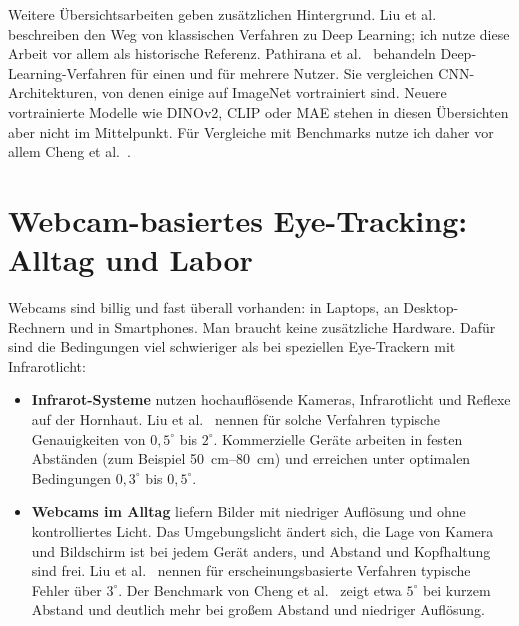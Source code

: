 Weitere Übersichtsarbeiten geben zusätzlichen Hintergrund. Liu et
al.~\cite{liu2022beholder} beschreiben den Weg von klassischen Verfahren zu
Deep Learning; ich nutze diese Arbeit vor allem als historische Referenz.
Pathirana et al.~\cite{pathirana2022survey} behandeln Deep-Learning-Verfahren
für einen und für mehrere Nutzer. Sie vergleichen CNN-Architekturen, von denen
einige auf ImageNet vortrainiert sind. Neuere vortrainierte Modelle wie DINOv2,
CLIP oder MAE stehen in diesen Übersichten aber nicht im Mittelpunkt. Für
Vergleiche mit Benchmarks nutze ich daher vor allem Cheng et
al.~\cite{cheng2024review}.

\section{Webcam-basiertes Eye-Tracking: Alltag und Labor}
\label{sec:webcam}
Webcams sind billig und fast überall vorhanden: in Laptops, an Desktop-Rechnern
und in Smartphones. Man braucht keine zusätzliche Hardware. Dafür sind die
Bedingungen viel schwieriger als bei speziellen Eye-Trackern mit Infrarotlicht:

\begin{itemize}
  \item \textbf{Infrarot-Systeme} nutzen hochauflösende Kameras, Infrarotlicht
        und Reflexe auf der Hornhaut. Liu et al.~\cite{liu2022beholder} nennen
        für solche Verfahren typische Genauigkeiten von $0,5^\circ$ bis
        $2^\circ$. Kommerzielle Geräte arbeiten in festen Abständen (zum
        Beispiel \SIrange{50}{80}{\centi\metre}) und erreichen unter optimalen
        Bedingungen $0,3^\circ$ bis $0,5^\circ$.
  \item \textbf{Webcams im Alltag} liefern Bilder mit niedriger Auflösung und
        ohne kontrolliertes Licht. Das Umgebungslicht ändert sich, die Lage
        von Kamera und Bildschirm ist bei jedem Gerät anders, und Abstand und
        Kopfhaltung sind frei. Liu et al.~\cite{liu2022beholder} nennen für
        erscheinungsbasierte Verfahren typische Fehler über $3^\circ$. Der
        Benchmark von Cheng et al.~\cite{cheng2024review} zeigt etwa $5^\circ$
        bei kurzem Abstand und deutlich mehr bei großem Abstand und niedriger
        Auflösung.
\end{itemize}

